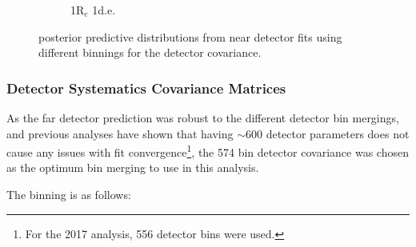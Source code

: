 \begin{figure}[!ht]
\begin{subfigure}{.49\textwidth}
  \caption{1R$_{e}$ 1d.e.}
\end{subfigure}
\caption{\SK posterior predictive distributions from near detector fits using different binnings for the detector covariance.}
\label{fig:detbinSK}
\end{figure}
\FloatBarrier

\subsubsection{Detector Systematics Covariance Matrices}\label{sec:detmat}

As the far detector prediction was robust to the different detector bin mergings, and previous analyses have shown that having $\sim$600 detector parameters does not cause any issues with fit convergence\footnote{For the 2017 analysis, 556 detector bins were used.}, the 574 bin detector covariance was chosen as the optimum bin merging to use in this analysis.

The binning is as follows:


